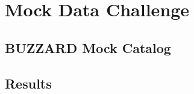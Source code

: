 \chapter{Mock Data Challenge}
\label{chap:mock-data-challenge}

\section{BUZZARD Mock Catalog}

\section{Results}